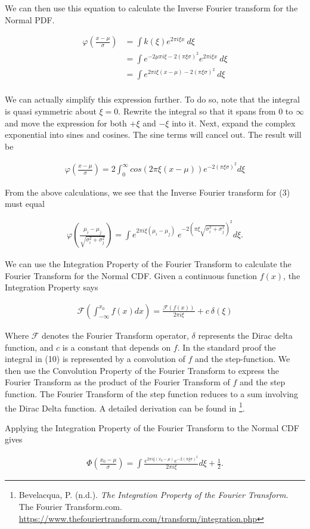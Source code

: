 \documentclass[]{article}
\begin{document}
We can then use this equation to calculate the Inverse Fourier transform
for the Normal PDF.

\begin{align*}
\varphi (\frac{x - \mu}{\sigma}) &= \int k(\xi) e^{2\pi i \xi x}\ d\xi\\
&= \int e^{-2 \mu \pi i \xi - 2(\pi \xi \sigma)^2} e^{2\pi i \xi x}\ d\xi\\
&= \int e^{2 \pi i \xi (x - \mu) - 2(\pi \xi \sigma)^2}\ d\xi\\
\end{align*}

We can actually simplify this expression further. To do so, note that
the integral is quasi symmetric about \(\xi = 0\). Rewrite the integral
so that it spans from 0 to \(\infty\) and move the expression for both
\(+\xi\) and \(- \xi\) into it. Next, expand the complex exponential
into sines and cosines. The sine terms will cancel out. The result will
be

\begin{align*}
\varphi (\frac{x - \mu}{\sigma}) = 2 \int_0^{\infty} cos (2 \pi \xi (x - \mu)) e^{-2(\pi \xi \sigma)^2} d\xi 
\end{align*}

From the above calculations, we see that the Inverse Fourier transform
for (3) must equal

\begin{align}
\varphi(\frac{\mu_i - \mu_j}{\sqrt{\sigma_i^2 + \sigma_j^2}}) = \int e^{2 \pi i \xi (\mu_i - \mu_j)}\ e^{-2(\pi \xi \sqrt{\sigma_i^2 + \sigma_j^2})^2} d\xi.
\end{align}

We can use the Integration Property of the Fourier Transform to
calculate the Fourier Transform for the Normal CDF. Given a continuous
function \(f (x)\), the Integration Property says

\begin{align}
\mathcal{F} (\int_{-\infty}^{x_0} f (x) dx) = \frac{\mathcal{F} (f(x))}{2 \pi i \xi} + c\ \delta(\xi)
\end{align}

Where \(\mathcal{F}\) denotes the Fourier Transform operator, \(\delta\)
represents the Dirac delta function, and \(c\) is a constant that
depends on \(f\). In the standard proof the integral in (10) is
represented by a convolution of \(f\) and the step-function. We then use
the Convolution Property of the Fourier Transform to express the Fourier
Transform as the product of the Fourier Transform of \(f\) and the step
function. The Fourier Transform of the step function reduces to a sum
involving the Dirac Delta function. A detailed derivation can be found
in \footnote{Bevelacqua, P. (n.d.). \emph{The Integration Property of
  the Fourier Transform}. The Fourier Transform.com.
  \url{https://www.thefouriertransform.com/transform/integration.php}}.

Applying the Integration Property of the Fourier Transform to the Normal
CDF gives

\begin{align}\Phi (\frac{x_0 - \mu}{\sigma}) = \int \frac{e^{2 \pi i \xi (x_0 - \mu)} e^{-2(\pi \xi \sigma)^2}}{2 \pi i \xi} d \xi + \frac{1}{2}.\end{align}
\end{document}
